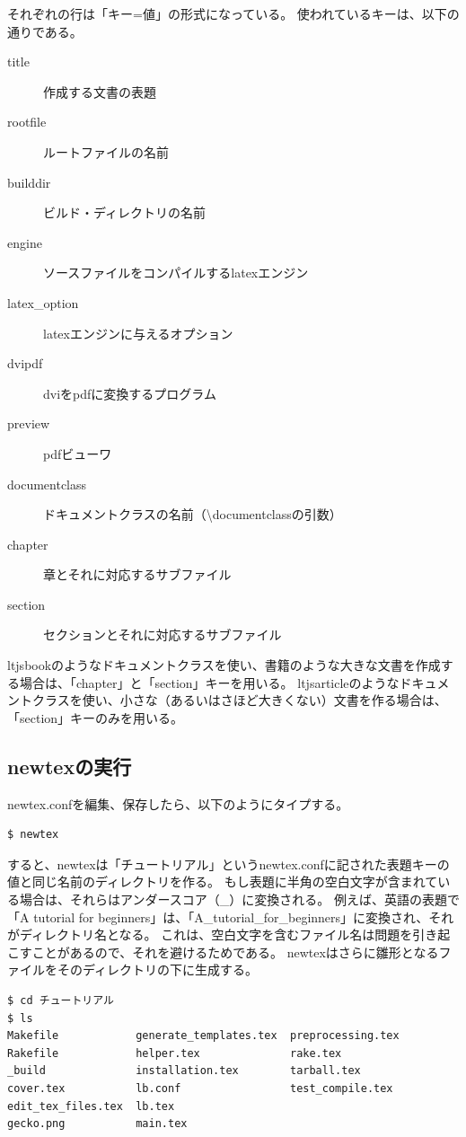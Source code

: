 それぞれの行は「キー=値」の形式になっている。
使われているキーは、以下の通りである。
\begin{description}
\item[title] 作成する文書の表題
\item[rootfile] ルートファイルの名前
\item[builddir] ビルド・ディレクトリの名前
\item[engine] ソースファイルをコンパイルするlatexエンジン
\item[latex\_option] latexエンジンに与えるオプション
\item[dvipdf] dviをpdfに変換するプログラム
\item[preview] pdfビューワ
\item[documentclass] ドキュメントクラスの名前（{\textbackslash}documentclassの引数）
\item[chapter] 章とそれに対応するサブファイル
\item[section] セクションとそれに対応するサブファイル
\end{description}
ltjsbookのようなドキュメントクラスを使い、書籍のような大きな文書を作成する場合は、「chapter」と「section」キーを用いる。
ltjsarticleのようなドキュメントクラスを使い、小さな（あるいはさほど大きくない）文書を作る場合は、「section」キーのみを用いる。

\subsection{newtexの実行}
newtex.confを編集、保存したら、以下のようにタイプする。
\begin{verbatim}
$ newtex
\end{verbatim}
すると、newtexは「チュートリアル」というnewtex.confに記された表題キーの値と同じ名前のディレクトリを作る。
もし表題に半角の空白文字が含まれている場合は、それらはアンダースコア（\_）に変換される。
例えば、英語の表題で「A tutorial for beginners」は、「A\_tutorial\_for\_beginners」に変換され、それがディレクトリ名となる。
これは、空白文字を含むファイル名は問題を引き起こすことがあるので、それを避けるためである。
newtexはさらに雛形となるファイルをそのディレクトリの下に生成する。
\begin{verbatim}
$ cd チュートリアル
$ ls
Makefile            generate_templates.tex  preprocessing.tex
Rakefile            helper.tex              rake.tex
_build              installation.tex        tarball.tex
cover.tex           lb.conf                 test_compile.tex
edit_tex_files.tex  lb.tex
gecko.png           main.tex
\end{verbatim}

